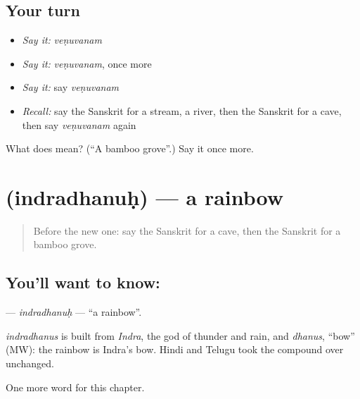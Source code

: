 \subsection*{Your turn}
\begin{itemize}
\raggedright
  \item \emph{Say it:} \emph{veṇuvanam}
  \item \emph{Say it:} \emph{veṇuvanam}, once more
  \item \emph{Say it:} say \emph{veṇuvanam}
  \item \emph{Recall:} say the Sanskrit for a stream, a river, then the Sanskrit for a cave, then say \emph{veṇuvanam} again
\end{itemize}

\begin{tcolorbox}[breakable,colback=teal!4,colframe=teal!35!black,title={Before you move on}]
What does  mean? (\textquotedblleft{}A bamboo grove\textquotedblright{}.) Say it once more.
\end{tcolorbox}
\section[\texorpdfstring{\sk{इन्द्रधनुः} (indradhanuḥ)}{इन्द्रधनुः (indradhanuḥ)}]{ (indradhanuḥ) — a rainbow}

\label{lesson:SA-C197-indradhanuh}



\begin{quote}
Before the new one: say the Sanskrit for a cave, then the Sanskrit for a bamboo grove.
\end{quote}

\subsection*{You'll want to know: }
\textbf{} — \emph{indradhanuḥ} — \textquotedblleft{}a rainbow\textquotedblright{}.

\begin{cousinweb}
\emph{indradhanus} is built from \emph{Indra}, the god of thunder and rain, and \emph{dhanus}, \textquotedblleft{}bow\textquotedblright{} (MW): the rainbow is Indra's bow. Hindi and Telugu took the compound over unchanged.
\end{cousinweb}

\begin{grammarlens}[title={What you've built}]
One more word for this chapter.
\end{grammarlens}

